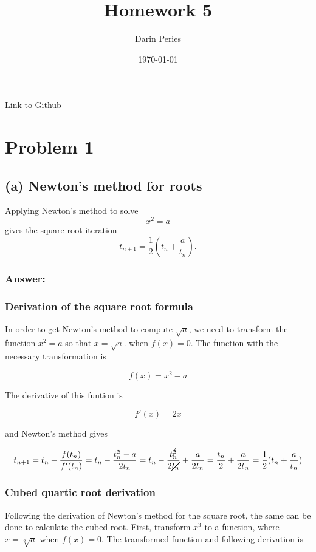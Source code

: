 \documentclass[11pt]{article}
\title{Homework 5}
\author{Darin Peries}
\date{\today}
\begin{document}
\maketitle

\noindent\href{https://github.com/dperry17/MATH609HW/tree/main/HW5}{Link to Github}

\section*{Problem 1}

\subsection*{(a) Newton's method for roots}

Applying Newton's method to solve
\[
x^2=a
\]
gives the square-root iteration
\[
t_{n+1}=\frac{1}{2}\left(t_n+\frac{a}{t_n}\right).
\]

\subsubsection*{Answer:}

\subsubsection*{Derivation of the square root formula}

\noindent In order to get Newton's method to compute $\sqrt{a}$, we need to transform the function $x^2=a$ so that $x=\sqrt{a}$.
when $f(x)=0$. The function with the necessary transformation is

$$f(x) = x^2 - a$$

\noindent The derivative of this funtion is 

$$f'(x) = 2x$$

\noindent and Newton's method gives

\[t_{n+1} = t_n - \frac{f(t_n)}{f'(t_n)} = t_n - \frac{t_n^2-a}{2t_n} =
 t_n - \frac{t_n^{\cancel{2}}}{2\cancel{t_n}} + \frac{a}{2t_n} = \frac{t_n}{2} + \frac{a}{2t_n}=
 \frac{1}{2}(t_n + \frac{a}{t_n})\]


\subsubsection*{Cubed quartic root derivation}
\noindent Following the derivation of Newton's method for the square root, the same can be done to calculate the cubed root.
First, transform $x^3$ to a function, where $x = \sqrt[3]{a}$ when $f(x) = 0$.
The transformed function and following derivation is
\end{document}
